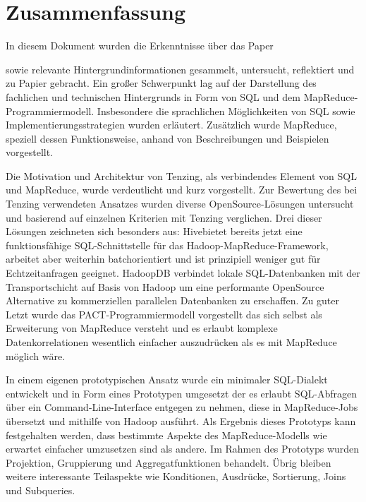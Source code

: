 \documentclass[a4paper]{article}
\begin{document}
\newpage

\section{Zusammenfassung}
\label{sec:resume}
In diesem Dokument wurden die Erkenntnisse über das Paper
\begin{quotation}
\end{quotation}
sowie relevante Hintergrundinformationen gesammelt, untersucht, reflektiert und zu Papier gebracht. Ein großer Schwerpunkt lag auf der Darstellung des fachlichen und technischen Hintergrunds in Form von SQL und dem MapReduce-Programmiermodell. Insbesondere die sprachlichen Möglichkeiten von SQL sowie Implementierungsstrategien wurden erläutert. Zusätzlich wurde MapReduce, speziell dessen Funktionsweise, anhand von Beschreibungen und Beispielen vorgestellt.

Die Motivation und Architektur von Tenzing, als verbindendes Element von SQL und MapReduce, wurde verdeutlicht und kurz vorgestellt. Zur Bewertung des bei Tenzing verwendeten Ansatzes wurden diverse OpenSource-Lösungen untersucht und basierend auf einzelnen Kriterien mit Tenzing verglichen. Drei dieser Lösungen zeichneten sich besonders aus: Hive\texttrademark bietet bereits jetzt eine funktionsfähige SQL-Schnittstelle für das Hadoop-MapReduce-Framework, arbeitet aber weiterhin batchorientiert und ist prinzipiell weniger gut für Echtzeitanfragen geeignet. HadoopDB verbindet lokale SQL-Datenbanken mit der Transportschicht auf Basis von Hadoop um eine performante OpenSource Alternative zu kommerziellen parallelen Datenbanken zu erschaffen. Zu guter Letzt wurde das PACT-Programmiermodell vorgestellt das sich selbst als Erweiterung von MapReduce versteht und es erlaubt komplexe Datenkorrelationen wesentlich einfacher auszudrücken als es mit MapReduce möglich wäre.

In einem eigenen prototypischen Ansatz wurde ein minimaler SQL-Dialekt entwickelt und in Form eines Prototypen umgesetzt der es erlaubt SQL-Abfragen über ein Command-Line-Interface entgegen zu nehmen, diese in MapReduce-Jobs übersetzt und mithilfe von Hadoop ausführt.
Als Ergebnis dieses Prototyps kann festgehalten werden, dass bestimmte Aspekte des MapReduce-Modells wie erwartet einfacher umzusetzen sind als andere. Im Rahmen des Prototyps wurden Projektion, Gruppierung und Aggregatfunktionen behandelt. Übrig bleiben weitere interessante Teilaspekte wie Konditionen, Ausdrücke, Sortierung, Joins und Subqueries.
\end{document}
